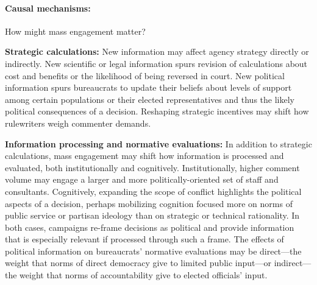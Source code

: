 \paragraph{Causal mechanisms:} How might mass engagement matter?

\textbf{Strategic calculations:} 
New information may affect agency strategy directly or indirectly. New scientific or legal information spurs revision of calculations about cost and benefits or the likelihood of being reversed in court. New political information spurs bureaucrats to update their beliefs about levels of support among certain populations or their elected representatives and thus the likely political consequences of a decision.
Reshaping strategic incentives may shift how rulewriters weigh commenter demands.

\textbf{Information processing and normative evaluations:} 
In addition to strategic calculations, mass engagement may shift how information is processed and evaluated, both institutionally and cognitively.
Institutionally, higher comment volume may engage a larger and more politically-oriented set of staff and consultants. Cognitively, expanding the scope of conflict highlights the political aspects of a decision, perhaps mobilizing cognition focused more on norms of public service or partisan ideology than on strategic or technical rationality. In both cases, campaigns re-frame decisions as political and provide information that is especially relevant if processed through such a frame.
The effects of political information on bureaucrats' normative evaluations may be
direct---the weight that norms of direct democracy give to limited public input---or 
indirect---the weight that norms of accountability give to elected officials' input.


